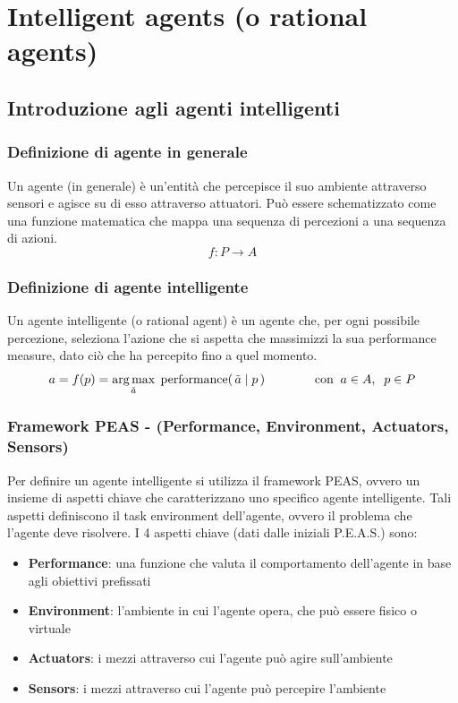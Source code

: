 \section{Intelligent agents (o rational agents)}
\subsection{Introduzione agli agenti intelligenti}
\subsubsection*{Definizione di agente in generale}
Un agente (in generale) è un'entità che percepisce il suo ambiente attraverso sensori e agisce su di esso attraverso attuatori.
Può essere schematizzato come una funzione matematica che mappa una sequenza di percezioni a una sequenza di azioni.
\[f : P \to A\]

\subsubsection*{Definizione di agente intelligente}
Un agente intelligente (o rational agent) è un agente che, per ogni possibile percezione, seleziona l'azione che si aspetta
che massimizzi la sua performance measure, dato ciò che ha percepito fino a quel momento.
\[a = f(p) = \operatorname*{arg\,max}_{\tilde{a}} \; \text{performance}(\, \tilde{a} \mid p \, ) \qquad\qquad \text{con} \;\; a \in A, \;\; p \in P\]

\subsubsection*{Framework PEAS - (Performance, Environment, Actuators, Sensors)}
Per definire un agente intelligente si utilizza il framework PEAS, ovvero un insieme di aspetti chiave che caratterizzano uno
specifico agente intelligente. Tali aspetti definiscono il task environment dell'agente, ovvero il problema che l'agente deve
risolvere. I 4 aspetti chiave (dati dalle iniziali P.E.A.S.) sono:
\begin{itemize}
	\item \textbf{Performance}: una funzione che valuta il comportamento dell'agente in base agli obiettivi prefissati
	\item \textbf{Environment}: l'ambiente in cui l'agente opera, che può essere fisico o virtuale
	\item \textbf{Actuators}: i mezzi attraverso cui l'agente può agire sull'ambiente
	\item \textbf{Sensors}: i mezzi attraverso cui l'agente può percepire l'ambiente
\end{itemize}

